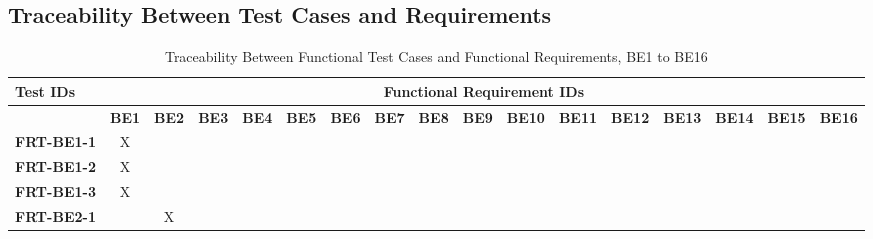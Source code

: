 \documentclass[12pt, titlepage]{article}
\begin{document}
\newpage
\begin{landscape}
	\subsection{Traceability Between Test Cases and Requirements}

	\begin{longtable}{|l|cccccccccccccccc|}
		\caption{Traceability Between Functional Test Cases and Functional Requirements, BE1 to BE16}                                                                                                                                                                                                                           \\
		\hline
		\textbf{Test IDs}   & \multicolumn{16}{c|}{\textbf{Functional Requirement IDs}}                                                                                                                                                                                                                                         \\
		\hline
		~                   & \textbf{BE1}                                              & \textbf{BE2} & \textbf{BE3} & \textbf{BE4} & \textbf{BE5} & \textbf{BE6} & \textbf{BE7} & \textbf{BE8} & \textbf{BE9} & \textbf{BE10} & \textbf{BE11} & \textbf{BE12} & \textbf{BE13} & \textbf{BE14} & \textbf{BE15} & \textbf{BE16} \\
		\hline
		\textbf{FRT-BE1-1}  & X                                                         & ~            & ~            & ~            & ~            & ~            & ~            & ~            & ~            & ~             & ~             & ~             & ~             & ~             & ~             & ~             \\
		\textbf{FRT-BE1-2}  & X                                                         & ~            & ~            & ~            & ~            & ~            & ~            & ~            & ~            & ~             & ~             & ~             & ~             & ~             & ~             & ~             \\
		\textbf{FRT-BE1-3}  & X                                                         & ~            & ~            & ~            & ~            & ~            & ~            & ~            & ~            & ~             & ~             & ~             & ~             & ~             & ~             & ~             \\
		\textbf{FRT-BE2-1}  & ~                                                         & X            & ~            & ~            & ~            & ~            & ~            & ~            & ~            & ~             & ~             & ~             & ~             & ~             & ~             & ~             \\

\end{longtable}
\end{landscape}
\end{document}

